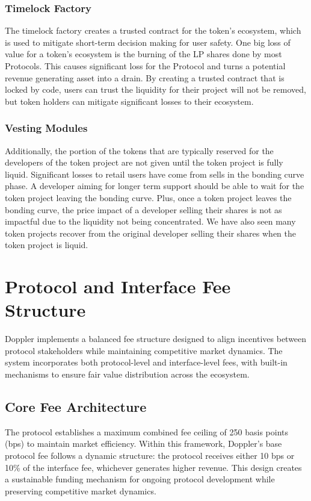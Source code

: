 \documentclass[sigconf,nonacm,prologue,table]{acmart}
\numberwithin{equation}{section}
\theoremstyle{definition}
\theoremstyle{remark}
\begin{document}
\subsubsection{Timelock Factory}

The timelock factory creates a trusted contract for the token's ecosystem, which is used to mitigate short-term decision making for user safety. One big loss of value for a token's ecosystem is the burning of the LP shares done by most Protocols. This causes significant loss for the Protocol and turns a potential revenue generating asset into a drain. By creating a trusted contract that is locked by code, users can trust the liquidity for their project will not be removed, but token holders can mitigate significant losses to their ecosystem.

\subsubsection{Vesting Modules}

Additionally, the portion of the tokens that are typically reserved for the developers of the token project are not given until the token project is fully liquid. Significant losses to retail users have come from sells in the bonding curve phase. A developer aiming for longer term support should be able to wait for the token project leaving the bonding curve. Plus, once a token project leaves the bonding curve, the price impact of a developer selling their shares is not as impactful due to the liquidity not being concentrated. We have also seen many token projects recover from the original developer selling their shares when the token project is liquid. 

\section{Protocol and Interface Fee Structure}

Doppler implements a balanced fee structure designed to align incentives between protocol stakeholders while maintaining competitive market dynamics. The system incorporates both protocol-level and interface-level fees, with built-in mechanisms to ensure fair value distribution across the ecosystem.

\subsection{Core Fee Architecture}
The protocol establishes a maximum combined fee ceiling of 250 basis points (bps) to maintain market efficiency. Within this framework, Doppler's base protocol fee follows a dynamic structure: the protocol receives either 10 bps or 10\% of the interface fee, whichever generates higher revenue. This design creates a sustainable funding mechanism for ongoing protocol development while preserving competitive market dynamics.
\end{document}
